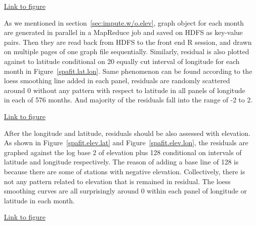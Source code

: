 \begin{framed}
\begin{center}
  \href{../plots/a1950/spafit/d2/span0.015/a1950.spaResid.vs.lon.lat.pdf}
  {Link to figure}
  \label{spafit.lon.lat}
\end{center}
\end{framed}

As we mentioned in section~\ref{sec:impute.w/o.elev}, graph object for each month 
are generated in parallel in a MapReduce job and saved on HDFS as key-value pairs. 
Then they are read back from HDFS to the front end R session, and drawn on multiple 
pages of one graph file sequentially. Similarly, residual is also plotted against 
to latitude conditional on 20 equally cut interval of longitude for each month 
in Figure~\href{../plots/a1950/spafit/d2/span0.015/a1950.spaResid.vs.lat.lon.pdf}
{\ref*{spafit.lat.lon}}. Same phenomenon can be found according to the loess 
smoothing line added in each panel, residuals are randomly scattered around 0 
without any pattern with respect to latitude in all panels of longitude in each 
of 576 months. And majority of the residuals fall into the range of -2 to 2.

\begin{framed}
\begin{center}
  \href{../plots/a1950/spafit/d2/span0.015/a1950.spaResid.vs.lat.lon.pdf}
  {Link to figure}
  \label{spafit.lat.lon}
\end{center}
\end{framed}

After the longitude and latitude, residuals should be also assessed with elevation.
As shown in 
Figure~\href{../plots/a1950/spafit/d2/span0.015/a1950.spaResid.vs.elev.lat.pdf}
{\ref*{spafit.elev.lat}} and 
Figure~\href{../plots/a1950/spafit/d2/span0.015/a1950.spaResid.vs.elev.lon.pdf}
{\ref*{spafit.elev.lon}}, the residuals are graphed against the log base 2 of
elevation plus 128 conditional on intervals of latitude and longitude respectively.
The reason of adding a base line of 128 is because there are some of stations 
with negative elevation. Collectively, there is not any pattern related to elevation
that is remained in residual. The loess smoothing curves are all surprisingly 
around 0 within each panel of longitude or latitude in each month.

\begin{framed}
\begin{center}
  \href{../plots/a1950/spafit/d2/span0.015/a1950.spaResid.vs.elev.lat.pdf}
  {Link to figure}
  \label{spafit.elev.lat}
\end{center}
\end{framed}

